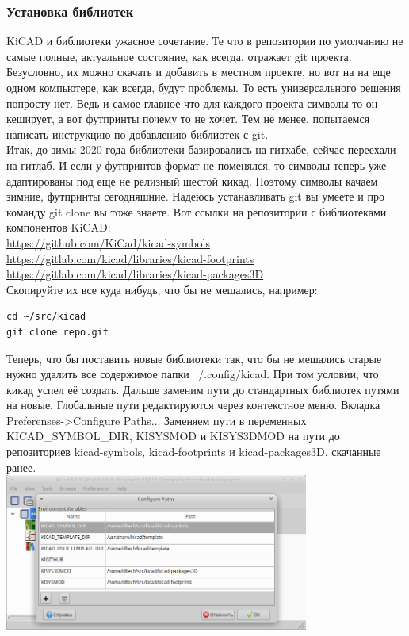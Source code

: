\documentclass[12pt,a4paper]{article}
\begin{document}
\subsubsection{Установка библиотек}
    KiCAD и библиотеки ужасное сочетание. Те что в репозитории по умолчанию не
    самые полные, актуальное состояние, как всегда, отражает git проекта.
    Безусловно, их можно скачать и добавить в местном проекте, но вот на
    на еще одном компьютере, как всегда, будут проблемы. То есть универсального
    решения попросту нет. Ведь и самое главное что для каждого проекта
     символы то он кеширует, а вот футпринты почему то не хочет.
    Тем не менее, попытаемся написать инструкцию по добавлению библиотек с git.\\
    Итак, до зимы 2020 года библиотеки базировались на гитхабе, сейчас переехали
    на гитлаб. И если у футпринтов формат не поменялся, то символы теперь уже
    адаптированы под еще не релизный шестой кикад. Поэтому символы качаем
    зимние, футпринты сегодняшние. Надеюсь устанавливать git вы умеете и про
    команду git clone вы тоже знаете.
    Вот ссылки на репозитории с библиотеками компонентов KiCAD:\\
    \url{https://github.com/KiCad/kicad-symbols}\\
    \url{https://gitlab.com/kicad/libraries/kicad-footprints}\\
    \url{https://gitlab.com/kicad/libraries/kicad-packages3D}\\
    Скопируйте их все куда нибудь, что бы не мешались, например:
\begin{lstlisting}
cd ~/src/kicad
git clone repo.git
\end{lstlisting}
    Теперь, что бы поставить новые библиотеки так, что бы не мешались старые
    нужно удалить все содержимое папки ~/.config/kicad. При том условии, что
    кикад успел её создать. Дальше заменим пути
    до стандартных библиотек путями на новые. Глобальные пути редактируются
    через контекстное меню. Вкладка Preferenses->Configure Paths...
    Заменяем пути в переменных KICAD\_SYMBOL\_DIR, KISYSMOD и KISYS3DMOD на пути
    до репозиториев kicad-symbols, kicad-footprints и kicad-packages3D, скачанные
    ранее.\\
    \includegraphics[width=10cm]{kipath.png}\\
\end{document}
